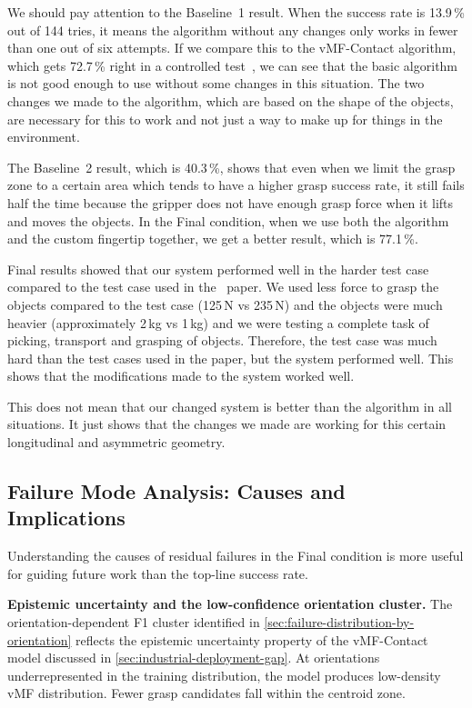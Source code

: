 \documentclass[oneside,studentpaper]{wbk}
\begin{document}
We should pay attention to the Baseline~1 result. When the success rate is 13.9\,\% out of 144 tries, it means the algorithm without any changes only works in fewer than one out of six attempts. If we compare this to the vMF-Contact algorithm, which gets 72.7\,\% right in a controlled test~\cite{shi2025}, we can see that the basic algorithm is not good enough to use without some changes in this situation. The two changes we made to the algorithm, which are based on the shape of the objects, are necessary for this to work and not just a way to make up for things in the environment.

The Baseline~2 result, which is 40.3\,\%, shows that even when we limit the grasp zone to a certain area which tends to have a higher grasp success rate, it still fails half the time because the gripper does not have enough grasp force when it lifts and moves the objects. In the Final condition, when we use both the algorithm and the custom fingertip together, we get a better result, which is 77.1\,\%. 

Final results showed that our system performed well in the harder test case compared to the test case used in the~\cite{shi2025} paper. We used less force to grasp the objects compared to the test case (125\,N vs 235\,N) and the objects were much heavier (approximately 2\,kg vs 1\,kg) and we were testing a complete task of picking, transport and grasping of objects. Therefore, the test case was much hard than the test cases used in the paper, but the system performed well. This shows that the modifications made to the system worked well.

This does not mean that our changed system is better than the algorithm in all situations. It just shows that the changes we made are working for this certain longitudinal and asymmetric geometry.

\subsection{Failure Mode Analysis: Causes and Implications}
\label{sec:failure-mode-analysis-discussion}

Understanding the causes of residual failures in the Final condition is more useful for guiding future work than the top-line success rate.

\textbf{Epistemic uncertainty and the low-confidence orientation cluster.} The orientation-dependent F1 cluster identified in \cref{sec:failure-distribution-by-orientation} reflects the epistemic uncertainty property of the vMF-Contact model discussed in \cref{sec:industrial-deployment-gap}. At orientations underrepresented in the training distribution, the model produces low-density vMF distribution. Fewer grasp candidates fall within the centroid zone. 
\end{document}
